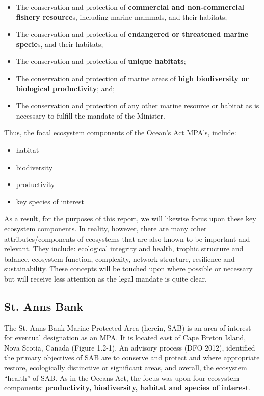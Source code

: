 \documentclass[letterpaper,portrait,12pt]{scrartcl}
\numberwithin{equation}{section}		%
\numberwithin{figure}{section}			%
\numberwithin{table}{section}				%
\begin{document}
\begin{itemize}
  \item The conservation and protection of\textbf{ commercial and non-commercial fishery resource}s, including marine mammals, and their habitats; 
  \item The conservation and protection of\textbf{ endangered or threatened marine specie}s, and their habitats; 
  \item The conservation and protection of\textbf{ unique habitats}; 
  \item The conservation and protection of marine areas of\textbf{ high biodiversity or biological productivity}; and; 
  \item The conservation and protection of any other marine resource or habitat as is necessary to fulfill the mandate of the Minister.
\end{itemize}

Thus, the focal ecosystem components of the Ocean's Act MPA's, include:

\begin{itemize}
  \item habitat
  \item biodiversity
  \item productivity 
  \item	key species of interest
\end{itemize}


As a result, for the purposes of this report, we will likewise focus upon these key ecosystem components. In reality, however, there are many other attributes/components of ecosystems that are also known to be important and relevant. They include: ecological integrity and health, trophic structure and balance, ecosystem function, complexity, network structure, resilience and sustainability. These concepts will be touched upon where possible or necessary but will receive less attention as the legal mandate is quite clear. 


\subsection{St. Anns Bank}

The St. Anns Bank Marine Protected Area (herein, SAB) is an area of interest for eventual designation as an MPA. It is located east of Cape Breton Island, Nova Scotia, Canada (Figure 1.2-1). An advisory process (DFO 2012), identified the primary objectives of SAB are to conserve and protect and where appropriate restore, ecologically distinctive or significant areas, and overall, the ecosystem {``}health'' of SAB. As in the Oceans Act, the focus was upon four ecosystem components: \textbf{productivity, biodiversity, habitat and species of interest}.
\end{document}
